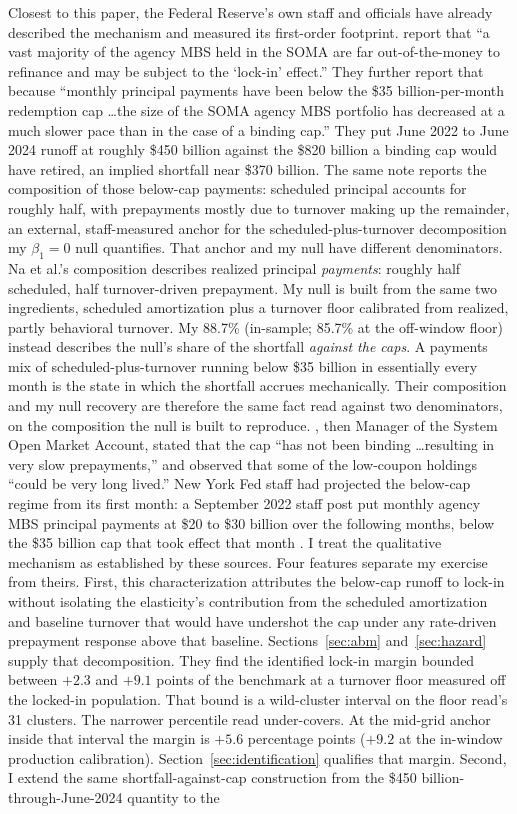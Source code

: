 \documentclass[12pt]{article}
\begin{document}
Closest to this paper, the Federal Reserve's own staff and officials have already described the mechanism and measured its first-order footprint. \citet{na2024} report that ``a vast majority of the agency MBS held in the SOMA are far out-of-the-money to refinance and may be subject to the `lock-in' effect.'' They further report that because ``monthly principal payments have been below the \$35 billion-per-month redemption cap \ldots the size of the SOMA agency MBS portfolio has decreased at a much slower pace than in the case of a binding cap.'' They put June 2022 to June 2024 runoff at roughly \$450 billion against the \$820 billion a binding cap would have retired, an implied shortfall near \$370 billion. The same note reports the composition of those below-cap payments: scheduled principal accounts for roughly half, with prepayments mostly due to turnover making up the remainder, an external, staff-measured anchor for the scheduled-plus-turnover decomposition my $\beta_1 = 0$ null quantifies. That anchor and my null have different denominators. Na et al.'s composition describes realized principal \emph{payments}: roughly half scheduled, half turnover-driven prepayment. My null is built from the same two ingredients, scheduled amortization plus a turnover floor calibrated from realized, partly behavioral turnover. My 88.7\% (in-sample; 85.7\% at the off-window floor) instead describes the null's share of the shortfall \emph{against the caps}. A payments mix of scheduled-plus-turnover running below \$35 billion in essentially every month is the state in which the shortfall accrues mechanically. Their composition and my null recovery are therefore the same fact read against two denominators, on the composition the null is built to reproduce. \citet{perli2024}, then Manager of the System Open Market Account, stated that the cap ``has not been binding \ldots resulting in very slow prepayments,'' and \citet{hammack2025} observed that some of the low-coupon holdings ``could be very long lived.'' New York Fed staff had projected the below-cap regime from its first month: a September 2022 staff post put monthly agency MBS principal payments at \$20 to \$30 billion over the following months, below the \$35 billion cap that took effect that month \citep{nyfed2022}. I treat the qualitative mechanism as established by these sources. Four features separate my exercise from theirs. First, this characterization attributes the below-cap runoff to lock-in without isolating the elasticity's contribution from the scheduled amortization and baseline turnover that would have undershot the cap under any rate-driven prepayment response above that baseline. Sections~\ref{sec:abm} and~\ref{sec:hazard} supply that decomposition. They find the identified lock-in margin bounded between $+2.3$ and $+9.1$ points of the benchmark at a turnover floor measured off the locked-in population. That bound is a wild-cluster interval on the floor read's 31 clusters. The narrower percentile read under-covers. At the mid-grid anchor inside that interval the margin is $+5.6$ percentage points ($+9.2$ at the in-window production calibration). Section~\ref{sec:identification} qualifies that margin. Second, I extend the same shortfall-against-cap construction from the \$450 billion-through-June-2024 quantity to the 
\end{document}
